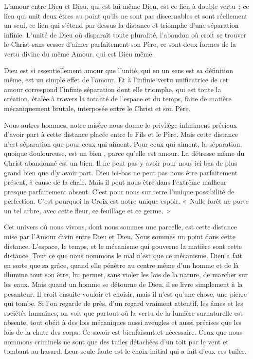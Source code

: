\documentclass[french,twoside]{book} %
\begin{document}
L'amour entre Dieu et Dieu, qui est lui-même Dieu, est ce lien à double vertu ; ce lien qui unit deux êtres au point qu'ils ne sont pas discernables et sont réellement un seul, ce lien qui s'étend par-dessus la distance et triomphe d'une séparation infinie. L'unité de Dieu où disparaît toute pluralité, l'abandon où croit se trouver le Christ sans cesser d'aimer parfaitement son Père, ce sont deux formes de la vertu divine du même Amour, qui est Dieu même.\par
Dieu est si essentiellement amour que l'unité, qui en un sens est sa définition même, est un simple effet de l'amour. Et à l'infinie vertu unificatrice de cet amour correspond l'infinie séparation dont elle triomphe, qui est toute la création, étalée à travers la totalité de l'espace et du temps, faite de matière mécaniquement brutale, interposée entre le Christ et son Père.\par
Nous autres hommes, notre misère nous donne le privilège infiniment précieux d'avoir part à cette distance placée entre le Fils et le Père. Mais cette distance n'est séparation que pour ceux qui aiment. Pour ceux qui aiment, la séparation, quoique douloureuse, est un bien , parce qu'elle est amour. La détresse même du Christ abandonné est un bien. Il ne peut pas y avoir pour nous ici-bas de plus grand bien que d'y avoir part. Dieu ici-bas ne peut pas nous être parfaitement présent, à cause de la chair. Mais il peut nous être dans l'extrême malheur presque parfaitement absent. C'est pour nous sur terre l'unique possibilité de perfection. C'est pourquoi la Croix est notre unique espoir. « Nulle forêt ne porte un tel arbre, avec cette fleur, ce feuillage et ce germe. »\par
Cet univers où nous vivons, dont nous sommes une parcelle, est cette distance mise par l'Amour divin entre Dieu et Dieu. Nous sommes un point dans cette distance. L'espace, le temps, et le mécanisme qui gouverne la matière sont cette distance. Tout ce que nous nommons le mal n'est que ce mécanisme. Dieu a fait en sorte que sa grâce, quand elle pénètre au centre même d'un homme et de là illumine tout son être, lui permet, sans violer les lois de la nature, de marcher sur les eaux. Mais quand un homme se détourne de Dieu, il se livre simplement à la pesanteur. Il croit ensuite vouloir et choisir, mais il n'est qu'une chose, une pierre qui tombe. Si l'on regarde de près, d'un regard vraiment attentif, les âmes et les sociétés humaines, on voit que partout où la vertu de la lumière surnaturelle est absente, tout obéit à des lois mécaniques aussi aveugles et aussi précises que les lois de la chute des corps. Ce savoir est bienfaisant et nécessaire. Ceux que nous nommons criminels ne sont que des tuiles détachées d'un toit par le vent et tombant au hasard. Leur seule faute est le choix initial qui a fait d'eux ces tuiles.\par
\end{document}
